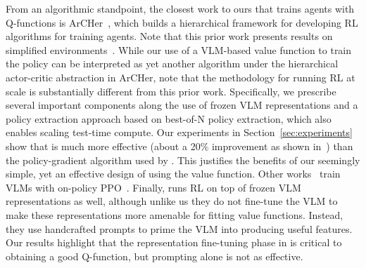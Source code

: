 From an algorithmic standpoint, the closest work to ours that trains agents with Q-functions is ArCHer~\citep{zhou2024archertraininglanguagemodel}, which builds a hierarchical framework for developing RL algorithms for training agents. Note that this prior work presents results on simplified environments~\citep{yao2023webshopscalablerealworldweb}. While our use of a VLM-based value function to train the policy can be interpreted as yet another algorithm under the hierarchical actor-critic abstraction in ArCHer, note that the methodology for running RL at scale is substantially different from this prior work. Specifically, we prescribe several important components along the use of frozen VLM representations and a policy extraction approach based on best-of-N policy extraction, which also enables scaling test-time compute. Our experiments in Section~\ref{sec:experiments} show that \ourmethod{} is much more effective (about a 20\% improvement as shown in~) than the policy-gradient algorithm used by \citet{zhou2024archertraininglanguagemodel}. This justifies the benefits of our seemingly simple, yet an effective design of using the value function. Other works~\citep{zhai2024finetuninglargevisionlanguagemodels} train VLMs with on-policy PPO~\citep{schulman2017proximalpolicyoptimizationalgorithms,chen2024visionlanguagemodelsprovidepromptable}. Finally, \citet{chen2024visionlanguagemodelsprovidepromptable} runs RL on top of frozen VLM representations as well, although unlike us they do not fine-tune the VLM to make these representations more amenable for fitting value functions. Instead, they use handcrafted prompts to prime the VLM into producing useful features. Our results highlight that the representation fine-tuning phase 
in \ourmethod{} is critical to obtaining a good Q-function, but prompting alone is not as effective.

